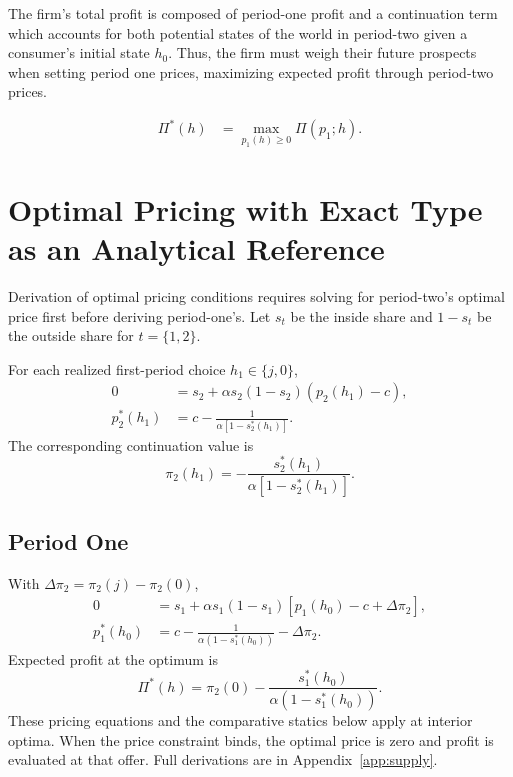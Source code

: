 \documentclass[12pt]{article}
\theoremstyle{definition}
\theoremstyle{remark}
\begin{document}
The firm's total profit is composed of period-one profit and a continuation term which accounts for both potential states of the world in period-two given a consumer's initial state $h_0$. Thus, the firm must weigh their future prospects when setting period one prices, maximizing expected profit through period-two prices. 

\begin{align}
 \Pi^*(h)&=\max_{p_1(h)\geq 0}\Pi(p_1;h).
\end{align}

\section{Optimal Pricing with Exact Type as an Analytical Reference}
\label{sec:optimal-pricing}

Derivation of optimal pricing conditions requires solving for period-two's optimal price first before deriving period-one's. Let $s_t$ be the inside share and $1-s_t$ be the outside share for $t=\{1,2\}$.

\label{subsec:foc}
For each realized first-period choice $h_1\in\{j,0\}$,
\begin{align}
0&=s_2+\alpha s_2(1-s_2)(p_2(h_1)-c),\\
 p_2^*(h_1)&=c-\frac{1}{\alpha[1-s_2^*(h_1)]}.
 \label{eq:supply-terminal}
\end{align}
The corresponding continuation value is
\begin{equation}
 \pi_2(h_1)=-\frac{s_2^*(h_1)}{\alpha[1-s_2^*(h_1)]}.
\end{equation}

\subsection{Period One}
\label{subsec:price-derivation}
With $\Delta \pi_2=\pi_2(j)-\pi_2(0)$,
\begin{align}
  0&=s_1+\alpha s_1(1-s_1)[p_1(h_0)-c+\Delta \pi_2],\\
  p_1^*(h_0)&=c-\frac{1}{\alpha(1-s^*_1(h_0))}-\Delta \pi_2.
 \label{eq:supply-first}
\end{align}
Expected profit at the optimum is
\begin{equation}
  \Pi^*(h)=\pi_2(0) - \frac{s^*_1(h_0)}{\alpha(1-s^*_1(h_0))}.
\end{equation}
These pricing equations and the comparative statics below apply at interior optima. When the price constraint binds, the optimal price is zero and profit is evaluated at that offer.
Full derivations are in Appendix~\ref{app:supply}.
\end{document}
